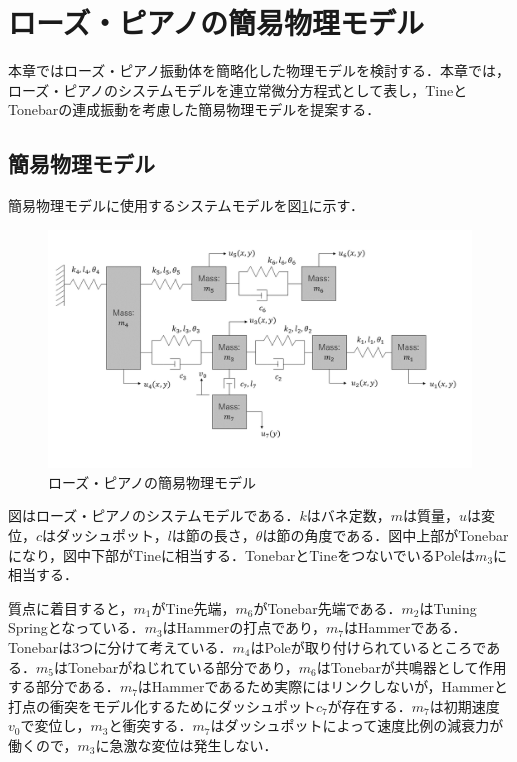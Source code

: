 \section{ローズ・ピアノの簡易物理モデル}

本章ではローズ・ピアノ振動体を簡略化した物理モデルを検討する．本章では，ローズ・ピアノのシステムモデルを連立常微分方程式として表し，TineとTonebarの連成振動を考慮した簡易物理モデルを提案する．

\subsection{簡易物理モデル}

簡易物理モデルに使用するシステムモデルを図\ref{fig:簡易モデル}に示す．

\begin{figure}
    \centering
    \includegraphics[width=15cm]{img/system-model.png}
    \caption{ローズ・ピアノの簡易物理モデル}
    \label{fig:簡易モデル}
\end{figure}

図はローズ・ピアノのシステムモデルである．$k$はバネ定数，$m$は質量，$u$は変位，$c$はダッシュポット，$l$は節の長さ，$\theta$は節の角度である．図中上部がTonebarになり，図中下部がTineに相当する．TonebarとTineをつないでいるPoleは$m_3$に相当する．

質点に着目すると，$m_1$がTine先端，$m_6$がTonebar先端である．$m_2$はTuning Springとなっている．$m_3$はHammerの打点であり，$m_7$はHammerである．Tonebarは3つに分けて考えている．$m_4$はPoleが取り付けられているところである．$m_5$はTonebarがねじれている部分であり，$m_6$はTonebarが共鳴器として作用する部分である．$m_7$はHammerであるため実際にはリンクしないが，Hammerと打点の衝突をモデル化するためにダッシュポット$c_7$が存在する．$m_7$は初期速度$v_0$で変位し，$m_3$と衝突する．$m_7$はダッシュポットによって速度比例の減衰力が働くので，$m_3$に急激な変位は発生しない．

